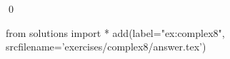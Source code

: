 
\begin{ex} 
  \label{ex:complex8}
  
  \qed
\end{ex} 
\begin{python0}
from solutions import *
add(label="ex:complex8",
    srcfilename='exercises/complex8/answer.tex') 
\end{python0}
